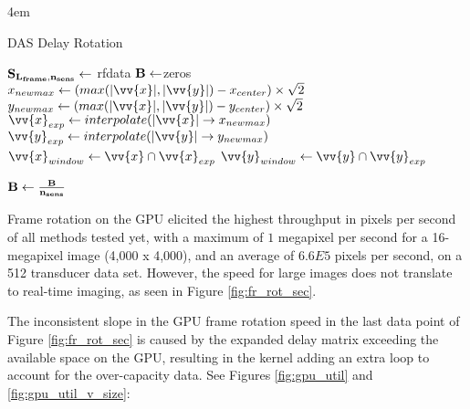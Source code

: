     \begin{algorithm} [H]
        \parindent4em
        \normalem
        \caption{DAS Delay Rotation}\label{algo:frame_rotate}
            $\bf{S}_{L_{frame},n_{sens}} \gets$ rfdata\;
            $\bf{B} \gets $zeros\;
            $x_{newmax} \gets (max(|\vv{x}|,|\vv{y}|) - x_{center})\times \sqrt{2}$\;
            $y_{newmax} \gets (max(|\vv{x}|,|\vv{y}|) - y_{center})\times \sqrt{2}$\;
            $\vv{x}_{exp} \gets interpolate(|\vv{x}| \to x_{newmax})$\;
            $\vv{y}_{exp} \gets interpolate(|\vv{y}| \to y_{newmax})$\;
            $\vv{x}_{window} \gets \vv{x} \cap \vv{x}_{exp}$\;
            $\vv{y}_{window} \gets \vv{y} \cap \vv{y}_{exp}$\;

            $\bf{B} \gets \frac{\bf{B}}{n_{sens}}$\;
    \end{algorithm}

    Frame rotation on the GPU elicited the highest throughput in pixels per second of all methods tested yet, with a maximum of $1$ megapixel per second for a 16-megapixel image (4,000 x 4,000), and an average of $6.6E5$ pixels per second, on a 512 transducer data set. However, the speed for large images does not translate to real-time imaging, as seen in Figure \ref{fig:fr_rot_sec}.


    The inconsistent slope in the GPU frame rotation speed in the last data point of Figure \ref{fig:fr_rot_sec} is caused by the expanded delay matrix exceeding the available space on the GPU, resulting in the kernel adding an extra loop to account for the over-capacity data. See Figures \ref{fig:gpu_util} and \ref{fig:gpu_util_v_size}:

